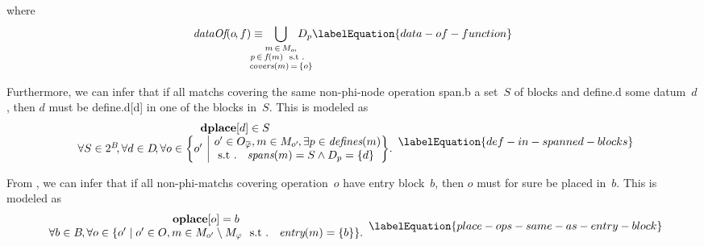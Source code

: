 %
where
%
\begin{equation}
  \mDataOf(o \hspace{-1pt}, f)
  \equiv
  \hspace{-1.5em}
  \bigcup_{\substack{%
                   m \, \in \, \mMatchSet[o] \hspace{-.8pt}, \\
                   p \, \in \, f\hspace{-1pt}(m) \text{ \st} \\
                   \mCovers(m) \, = \, \mSet{o}
                 }}
  \hspace{-1.5em}
  \mDataSet[p]
  \labelEquation{data-of-function}
\end{equation}

Furthermore, we can infer that if all \glspl{match} covering the same
non-\gls{phi-node} \gls{operation} \gls{span.b} a set~$S$ of \glspl{block} and
\gls{define.d} some \gls{datum}~$d$\hspace{-1pt}, then $d$ must be
\gls{define.d}[d] in one of the \glspl{block} in~$S$\hspace{-.8pt}.
%
This is modeled as
%
\begin{equation}
  \begin{array}{c}
    \mVar{dplace}[d] \in S \\
    \forall S \in \mPowerset{\mBlockSet} \hspace{-2pt},
    \forall d \in \mDataSet \!,
    \forall o \in
      \mSetBuilder*{o'}%
                   {%
                     \begin{array}{@{}l@{}}
                       o' \in \mOpCompSet{\mPhi},
                       m \in \mMatchSet[o'] \hspace{-1pt},
                       \exists p \in \mDefines(m) \\
                       \text{\st }
                       \mSpans(m) = S \mAnd \mDataSet[p] = \mSet{d}
                     \end{array}
                   } \!.
  \end{array}
  \labelEquation{def-in-spanned-blocks}
\end{equation}

From , we can infer that if all
non-\glspl{phi-match} covering \gls{operation}~$o$ have \gls{entry
  block}~$b$\hspace{-1pt}, then $o$ must for sure be placed in~$b$\hspace{-1pt}.
%
This is modeled as
%
\begin{equation}
  \begin{array}{c}
    \mVar{oplace}[o] = b \\
    \forall b \in \mBlockSet \hspace{-1pt},
    \forall o \in
      \mSetBuilder{o'}%
                  {%
                    o' \in \mOpSet,
                    m \in \mMatchSet[o'] \setminus \mPhiMatchSet
                    \text{ \st }
                    \mEntry(m) = \mSet{b}
                  }.
  \end{array}
  \labelEquation{place-ops-same-as-entry-block}
\end{equation}

